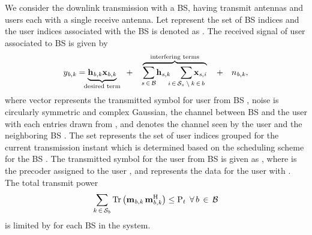 We consider the downlink transmission with a  \ac{BS}, having  transmit antennas and  users each with a single receive antenna. Let  represent the set of \ac{BS} indices and the user indices associated with the \ac{BS}  is denoted as . The received signal  of user  associated to \ac{BS}  is given by
\begin{eqnarray}
\msclxyz{y}{b}{k} = \underbrace{\mvecxyz{h}{b}{k} \mvecxyz{x}{b}{k}}_{\mathclap{\text{desired term}}} \quad + \quad \overbrace{\sum_{\mathclap{s \inm \mc{B}}} \mvecxyz{h}{s}{k} \quad \sum_{\mathclap{i \inm \mc{S}_s \bs k \inm b}} \mvecxyz{x}{s}{i}}^{\mathclap{\text{interfering terms}}} \quad + \quad \msclxyz{n}{b}{k},
\label{sm-e1}
\end{eqnarray}
where vector  represents the transmitted symbol for user  from \ac{BS} , noise  is circularly symmetric and complex Gaussian, the channel  between \ac{BS}  and the user  with each entries drawn from , and  denotes the channel seen by the user  and the neighboring \ac{BS} . The set  represents the set of user indices grouped for the current transmission instant which is determined based on the scheduling scheme for the \ac{BS} . The transmitted symbol  for the user  from \ac{BS}  is given as , where  is the precoder assigned to the user , and  represents the data for the  user with . The total transmit power
\begin{equation}
\sum_{k \inm \mc{S}_b} \mrm{Tr} \left ( \mvecxyz{m}{b}{k} \, \mvecxyz{m}{b}{k}^{\mrm{H}} \right ) \leq \mrm{P}_{t} \; \fall b \inm \mc{B}
\label{sm-e2}
\end{equation}
is limited by  for each \ac{BS} in the system.

